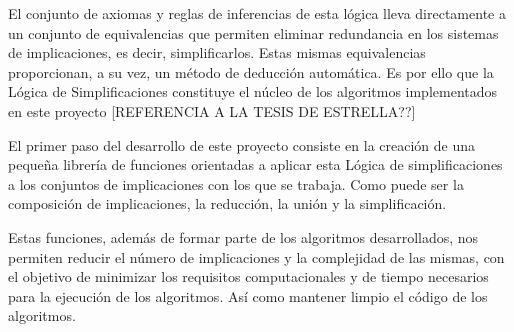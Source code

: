 El conjunto de axiomas y reglas de inferencias de esta l\'ogica lleva directamente a un conjunto de equivalencias que permiten eliminar redundancia en los sistemas de implicaciones, es decir, simplificarlos. Estas mismas equivalencias proporcionan, a su vez, un m\'etodo de deducci\'on autom\'atica. Es por ello que la L\'ogica de Simplificaciones constituye el n\'ucleo de los algoritmos implementados en este proyecto [REFERENCIA A LA TESIS DE ESTRELLA??]

El primer paso del desarrollo de este proyecto consiste en la creaci\'on de una peque\~na librer\'ia de funciones
orientadas a aplicar esta L\'ogica de simplificaciones a los conjuntos de implicaciones con los que se trabaja. Como 
puede ser la composici\'on de implicaciones, la reducci\'on, la uni\'on y la simplificaci\'on.

Estas funciones, adem\'as de formar parte de los algoritmos desarrollados, nos permiten reducir el n\'umero de 
implicaciones y la complejidad de las mismas, con el objetivo de minimizar los requisitos computacionales y de tiempo
necesarios para la ejecuci\'on de los algoritmos. As\'i como mantener limpio el c\'odigo de los algoritmos.










